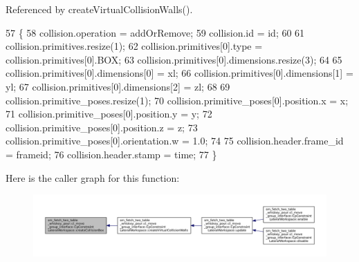 Referenced by create\+Virtual\+Collision\+Walls().


\begin{DoxyCode}
57         \{
58             collision.operation = addOrRemove;
59             collision.id = id;
60 
61             collision.primitives.resize(1);
62             collision.primitives[0].type = collision.primitives[0].BOX;
63             collision.primitives[0].dimensions.resize(3);
64 
65             collision.primitives[0].dimensions[0] = xl;
66             collision.primitives[0].dimensions[1] = yl;
67             collision.primitives[0].dimensions[2] = zl;
68 
69             collision.primitive\_poses.resize(1);
70             collision.primitive\_poses[0].position.x = x;
71             collision.primitive\_poses[0].position.y = y;
72             collision.primitive\_poses[0].position.z = z;
73             collision.primitive\_poses[0].orientation.w = 1.0;
74 
75             collision.header.frame\_id = frameid;
76             collision.header.stamp = time;
77         \}
\end{DoxyCode}
Here is the caller graph for this function\+:
\nopagebreak
\begin{figure}[H]
\begin{center}
\leavevmode
\includegraphics[width=350pt]{classsm__fetch__two__table__whiskey__pour_1_1cl__move__group__interface_1_1CpConstraintLateralWorkspace_a4a642b0ab3ecf802443e9f61222ea76d_icgraph}
\end{center}
\end{figure}
\mbox{\label{classsm__fetch__two__table__whiskey__pour_1_1cl__move__group__interface_1_1CpConstraintLateralWorkspace_ac4f1fdc1009b0a351c17b938f8cca1fd}} 
